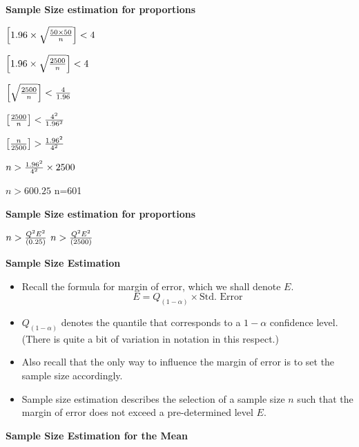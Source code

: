 \documentclass[]{report}
\begin{document}

\textbf{Sample Size estimation for proportions}

$\left[1.96 \times \sqrt{{ 50 \times 50 \over n}} \right]< 4 $


$\left[1.96 \times \sqrt{{ 2500 \over n}} \right]< 4 $

$\left[ \sqrt{{ 2500 \over n}} \right]< {4 \over 1.96}$

$\left[ { 2500 \over n} \right]< {4^2 \over 1.96^2}$

$\left[ { n \over 2500} \right]> {1.96^2 \over 4^2}$

$n> {1.96^2 \over 4^2} \times 2500$

$n>600.25$ 
n=601



\textbf{Sample Size estimation for proportions}


$n> {Q^2E^2 \over (0.25)}$
$n >{Q^2 E^2 \over (2500)}$




\textbf{Sample Size Estimation}

\begin{itemize} \item Recall the formula for margin of error, which we shall denote $E$.
\[  E = Q_{(1-\alpha)} \times \mbox{Std. Error}\]

\item $Q_{(1-\alpha)}$ denotes the quantile that corresponds to a $1-\alpha$ confidence level. (There is quite a bit of variation in notation in this respect.)
\item Also recall that the only way to influence the margin of error is to set the sample size accordingly.

\item Sample size estimation describes the selection of a sample size $n$ such that the margin of error does not exceed a pre-determined level $E$.
\end{itemize}



\textbf{Sample Size Estimation for the Mean}
\end{document}

